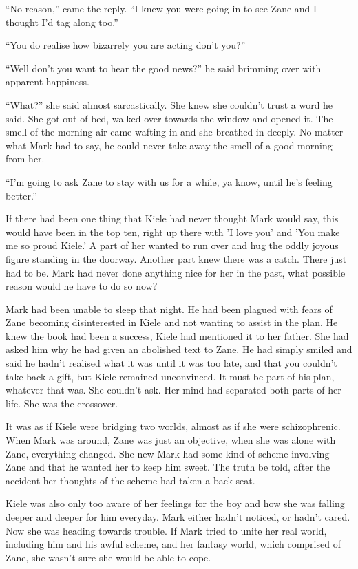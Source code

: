 ``No reason,'' came the reply.  ``I knew you were going in to see Zane and I thought I'd tag along too.''

``You do realise how bizarrely you are acting don't you?''

``Well don't you want to hear the good news?'' he said brimming over with apparent happiness.

``What?'' she said almost sarcastically.  She knew she couldn't trust a word he said.  She got out of bed, walked over towards the window and opened it.  The smell of the morning air came wafting in and she breathed in deeply.  No matter what Mark had to say, he could never take away the smell of a good morning from her.

``I'm going to ask Zane to stay with us for a while, ya know, until he's feeling better.''

If there had been one thing that Kiele had never thought Mark would say, this would have been in the top ten, right up there with 'I love you' and 'You make me so proud Kiele.'  A part of her wanted to run over and hug the oddly joyous figure standing in the doorway.  Another part knew there was a catch.  There just had to be.  Mark had never done anything nice for her in the past, what possible reason would he have to do so now?

Mark had been unable to sleep that night.  He had been plagued with fears of Zane becoming disinterested in Kiele and not wanting to assist in the plan.  He knew the book had been a success, Kiele had mentioned it to her father.  She had asked him why he had given an abolished text to Zane.  He had simply smiled and said he hadn't realised what it was until it was too late, and that you couldn't take back a gift, but Kiele remained unconvinced.  It must be part of his plan, whatever that was.  She couldn't ask.  Her mind had separated both parts of her life.  She was the crossover.  

It was as if Kiele were bridging two worlds, almost as if she were schizophrenic.  When Mark was around, Zane was just an objective, when she was alone with Zane, everything changed.  She new Mark had some kind of scheme involving Zane and that he wanted her to keep him sweet.  The truth be told, after the accident her thoughts of the scheme had taken a back seat.  

Kiele was also only too aware of her feelings for the boy and how she was falling deeper and deeper for him everyday.  Mark either hadn't noticed, or hadn't cared.  Now she was heading towards trouble.  If Mark tried to unite her real world, including him and his awful scheme, and her fantasy world, which comprised of Zane, she wasn't sure she would be able to cope.

